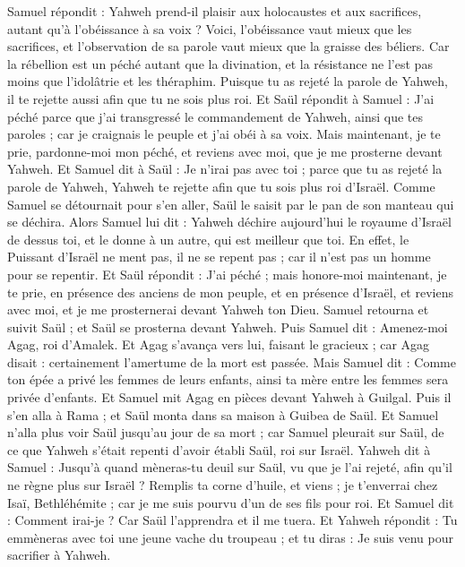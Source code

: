 \begin{multicols}{2}
Samuel répondit : Yahweh prend-il plaisir aux holocaustes et aux sacrifices, autant qu’à l’obéissance à sa voix ? Voici, l'obéissance vaut mieux que les sacrifices, et l’observation de sa parole vaut mieux que la graisse des béliers.
Car la rébellion est un péché autant que la divination, et la résistance ne l’est pas moins que l’idolâtrie et les théraphim. Puisque tu as rejeté la parole de Yahweh, il te rejette aussi afin que tu ne sois plus roi.
Et Saül répondit à Samuel : J'ai péché parce que j'ai transgressé le commandement de Yahweh, ainsi que tes paroles ; car je craignais le peuple et j'ai obéi à sa voix.
Mais maintenant, je te prie, pardonne-moi mon péché, et reviens avec moi, que je me prosterne devant Yahweh.
Et Samuel dit à Saül : Je n’irai pas avec toi ; parce que tu as rejeté la parole de Yahweh, Yahweh te rejette afin que tu sois plus roi d’Israël.
Comme Samuel se détournait pour s'en aller, Saül le saisit par le pan de son manteau qui se déchira.
Alors Samuel lui dit : Yahweh déchire aujourd'hui le royaume d'Israël de dessus toi, et le donne à un autre, qui est meilleur que toi.
En effet, le Puissant d'Israël ne ment pas, il ne se repent pas ; car il n'est pas un homme pour se repentir.
Et Saül répondit : J'ai péché ; mais honore-moi maintenant, je te prie, en présence des anciens de mon peuple, et en présence d'Israël, et reviens avec moi, et je me prosternerai devant Yahweh ton Dieu.
Samuel retourna et suivit Saül ; et Saül se prosterna devant Yahweh.
Puis Samuel dit : Amenez-moi Agag, roi d'Amalek. Et Agag s’avança vers lui, faisant le gracieux ; car Agag disait : certainement l'amertume de la mort est passée.
Mais Samuel dit : Comme ton épée a privé les femmes de leurs enfants, ainsi ta mère entre les femmes sera privée d'enfants. Et Samuel mit Agag en pièces devant Yahweh à Guilgal.
Puis il s'en alla à Rama ; et Saül monta dans sa maison à Guibea de Saül.
Et Samuel n'alla plus voir Saül jusqu'au jour de sa mort ; car Samuel pleurait sur Saül, de ce que Yahweh s'était repenti d'avoir établi Saül, roi sur Israël.
\VerseOne{}Yahweh dit à Samuel : Jusqu'à quand mèneras-tu deuil sur Saül, vu que je l'ai rejeté, afin qu'il ne règne plus sur Israël ? Remplis ta corne d'huile, et viens ; je t’enverrai chez Isaï, Bethléhémite ; car je me suis pourvu d'un de ses fils pour roi.
Et Samuel dit : Comment irai-je ? Car Saül l’apprendra et il me tuera. Et Yahweh répondit : Tu emmèneras avec toi une jeune vache du troupeau ; et tu diras : Je suis venu pour sacrifier à Yahweh.

\end{multicols}
